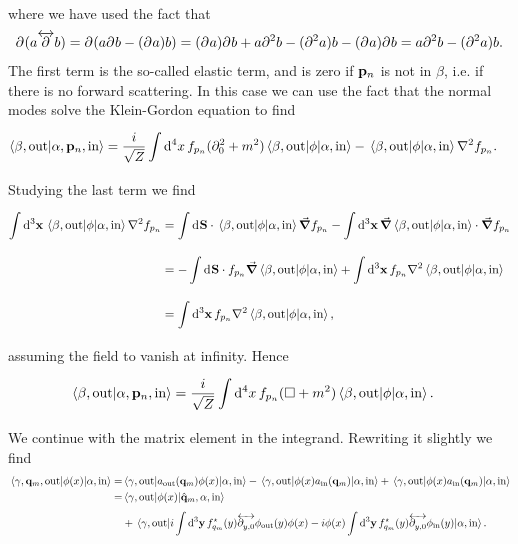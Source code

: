 where we have used the fact that
\begin{align*}
	\partial^{}_{}(a\overleftrightarrow{\partial^{}_{}}b) = \partial^{}_{}(a\partial^{}_{}b - (\partial^{}_{}a)b) = (\partial^{}_{}a)\partial^{}_{}b + a\partial^{2}_{}b - (\partial^{2}_{}a)b - (\partial^{}_{}a)\partial^{}_{}b = a\partial^{2}_{}b - (\partial^{2}_{}a)b.
\end{align*}
The first term is the so-called elastic term, and is zero if $\vb{p}_{n}$ is not in $\beta$, i.e. if there is no forward scattering. In this case we can use the fact that the normal modes solve the Klein-Gordon equation to find
\begin{align*}
	\braket{\beta, \text{out}}{\alpha, \vb{p}_{n}, \text{in}} &= \frac{i}{\sqrt{Z}}\integ[4]{}{}{x}{f_{p_{n}}(\del{2}{0} + m^{2})\mel{\beta, \text{out}}{\phi}{\alpha, \text{in}} - \mel{\beta, \text{out}}{\phi}{\alpha, \text{in}}\laplacian f_{p_{n}}}.
\end{align*}
Studying the last term we find
\begin{align*}
	\integ[3]{}{}{\vb{x}}{\mel{\beta, \text{out}}{\phi}{\alpha, \text{in}}\laplacian f_{p_{n}}} &= \integ{}{}{\vb{S}}{\cdot\mel{\beta, \text{out}}{\phi}{\alpha, \text{in}}\grad f_{p_{n}}} - \integ[3]{}{}{\vb{x}}{\grad\mel{\beta, \text{out}}{\phi}{\alpha, \text{in}}\cdot\grad f_{p_{n}}} \\
	           &= -\integ{}{}{\vb{S}}{\cdot f_{p_{n}}\grad\mel{\beta, \text{out}}{\phi}{\alpha, \text{in}}} + \integ[3]{}{}{\vb{x}}{f_{p_{n}}\laplacian\mel{\beta, \text{out}}{\phi}{\alpha, \text{in}}} \\
	           &= \integ[3]{}{}{\vb{x}}{f_{p_{n}}\laplacian\mel{\beta, \text{out}}{\phi}{\alpha, \text{in}}},
\end{align*}
assuming the field to vanish at infinity. Hence
\begin{align*}
	\braket{\beta, \text{out}}{\alpha, \vb{p}_{n}, \text{in}} &= \frac{i}{\sqrt{Z}}\int\limits_{}^{}\dd[4]{x}f_{p_{n}}(\square + m^{2})\mel{\beta, \text{out}}{\phi}{\alpha, \text{in}}.
\end{align*}
We continue with the matrix element in the integrand. Rewriting it slightly we find
\begin{align*}
	\mel{\gamma, \vb{q}_{m}, \text{out}}{\phi(x)}{\alpha, \text{in}} =& \mel{\gamma, \text{out}}{a_{\text{out}}(\vb{q}_{m})\phi(x)}{\alpha, \text{in}} - \mel{\gamma, \text{out}}{\phi(x)a_{\text{in}}(\vb{q}_{m})}{\alpha, \text{in}} + \mel{\gamma, \text{out}}{\phi(x)a_{\text{in}}(\vb{q}_{m})}{\alpha, \text{in}} \\
	=& \mel{\gamma, \text{out}}{\phi(x)}{\hat{\vb{q}}_{m}, \alpha, \text{in}} \\
	 &+ \mel{\gamma, \text{out}}{i\int\limits_{}^{}\dd[3]{\vb{y}}f_{q_{m}}\ensuremath{^{\star}}(y)\ensuremath{\overleftrightarrow{\partial^{}_{y, 0}}}\phi_{\text{out}}(y)\phi(x) - i\phi(x)\int\limits_{}^{}\dd[3]{\vb{y}}f_{q_{m}}\ensuremath{^{\star}}(y)\ensuremath{\overleftrightarrow{\partial^{}_{y, 0}}}\phi_{\text{in}}(y)}{\alpha, \text{in}}.
\end{align*}
